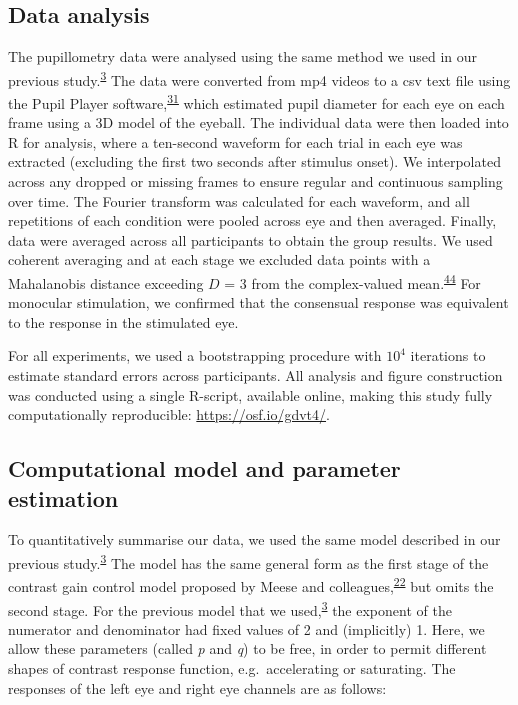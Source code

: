 \documentclass[
]{article}
\begin{document}
\hypertarget{data-analysis}{%
\subsection{Data analysis}\label{data-analysis}}

The pupillometry data were analysed using the same method we used in our previous study.\textsuperscript{\protect\hyperlink{ref-Segala2023}{3}} The data were converted from mp4 videos to a csv text file using the Pupil Player software,\textsuperscript{\protect\hyperlink{ref-Kassner2014}{31}} which estimated pupil diameter for each eye on each frame using a 3D model of the eyeball. The individual data were then loaded into R for analysis, where a ten-second waveform for each trial in each eye was extracted (excluding the first two seconds after stimulus onset). We interpolated across any dropped or missing frames to ensure regular and continuous sampling over time. The Fourier transform was calculated for each waveform, and all repetitions of each condition were pooled across eye and then averaged. Finally, data were averaged across all participants to obtain the group results. We used coherent averaging and at each stage we excluded data points with a Mahalanobis distance exceeding \(D\) = 3 from the complex-valued mean.\textsuperscript{\protect\hyperlink{ref-Baker2021}{44}} For monocular stimulation, we confirmed that the consensual response was equivalent to the response in the stimulated eye.

For all experiments, we used a bootstrapping procedure with \ensuremath{10^{4}} iterations to estimate standard errors across participants. All analysis and figure construction was conducted using a single R-script, available online, making this study fully computationally reproducible: \url{https://osf.io/gdvt4/}.

\hypertarget{computational-model-and-parameter-estimation}{%
\subsection{Computational model and parameter estimation}\label{computational-model-and-parameter-estimation}}

To quantitatively summarise our data, we used the same model described in our previous study.\textsuperscript{\protect\hyperlink{ref-Segala2023}{3}} The model has the same general form as the first stage of the contrast gain control model proposed by Meese and colleagues,\textsuperscript{\protect\hyperlink{ref-Meese2006}{22}} but omits the second stage. For the previous model that we used,\textsuperscript{\protect\hyperlink{ref-Segala2023}{3}} the exponent of the numerator and denominator had fixed values of 2 and (implicitly) 1. Here, we allow these parameters (called \emph{p} and \emph{q}) to be free, in order to permit different shapes of contrast response function, e.g.~accelerating or saturating. The responses of the left eye and right eye channels are as follows:
\end{document}

